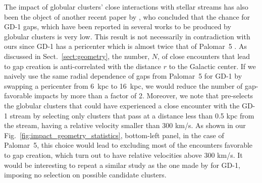 \documentclass{aa}
\begin{document}
  The impact of globular clusters' close interactions with stellar streams has also been the object of another recent paper by \citet{2022ApJ...941..129D}, who concluded that the chance for GD-1 gaps, which have been reported in several works \citep[see, for example, ][]{2019ApJ...880...38B,2018MNRAS.477.1893D,2020AAS...23533607D} to be produced by globular clusters is very low. This result is not necessarily in contradiction with ours since GD-1 has a pericenter which is almost twice that of Palomar~5 \citep[see, for example][]{2019MNRAS.486.2995M}. As discussed in Sect.~\ref{sect:geometry}, the number, $N$, of close encounters that lead to gap creation is anti-correlated with the distance $r$ to the Galactic center. If we naively use the same radial dependence of gaps from Palomar~5 for GD-1 by swapping a pericenter from 6~kpc to 16~kpc, we would reduce the number of gap-favorable impacts by more than a factor of 2. Moreover, we note that \citet{2022ApJ...941..129D} pre-selects the globular clusters that could have experienced a close encounter with the GD-1 stream by selecting only clusters that pass at a distance less than 0.5 kpc from the stream, having a relative velocity smaller than  300 km/s. As shown in our Fig.~\ref{fig:impact_geometry_statistics}, bottom-left panel, in the case of Palomar~5, this choice would lead to excluding most of the encounters favorable to gap creation, which turn out to have relative velocities above 300 km/s. It would be interesting to repeat a similar study as the one made by \citet{2022ApJ...941..129D} for GD-1, imposing no selection on possible candidate clusters.\\
  
\end{document}
